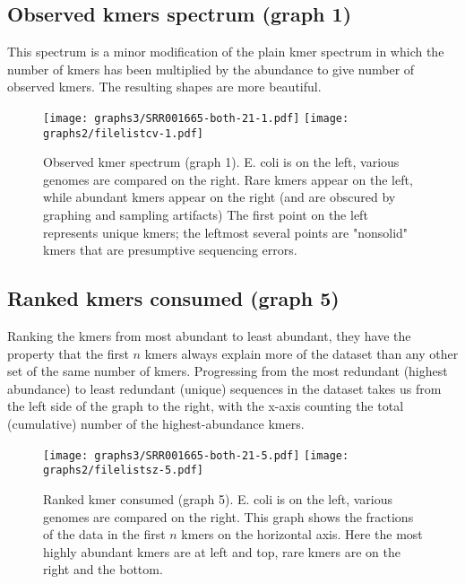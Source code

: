 \documentclass[11pt,fullpage]{article}
\begin{document}
\subsection{Observed kmers spectrum (graph 1) }

This spectrum is a minor modification of the plain kmer spectrum in which the number
of kmers has been multiplied by the abundance to give number of observed kmers.
The resulting shapes are more beautiful. 

\begin{figure}
\begin{center}
\texttt{[image: graphs3/SRR001665-both-21-1.pdf]} \texttt{[image: graphs2/filelistcv-1.pdf]}
\end{center}
\caption{Observed kmer spectrum (graph 1).  E. coli is on the left, various genomes are compared on the right.  
Rare kmers appear on the left, while abundant kmers appear on the right (and are obscured by graphing and sampling artifacts) 
The first point on the left represents unique kmers; the leftmost several points are "nonsolid" kmers
that are presumptive sequencing errors. }
\label{graph1}
\end{figure}

\subsection{Ranked kmers consumed (graph 5) }

Ranking the kmers from most abundant to least abundant, they have the property that the 
first $n$ kmers always explain more of the dataset than any other set of the same number
of kmers.  Progressing from the most redundant (highest abundance) to least redundant 
(unique) sequences in the dataset takes us from the left side of the graph to the right, 
with the x-axis counting the total (cumulative) number of the highest-abundance kmers.

\begin{figure}
\begin{center}
\texttt{[image: graphs3/SRR001665-both-21-5.pdf]} \texttt{[image: graphs2/filelistsz-5.pdf]}
\end{center}
\caption{Ranked kmer consumed (graph 5).  E. coli is on the left, various genomes are compared on the right. This 
graph shows the fractions of the data in the first $n$ kmers on the horizontal axis.  Here the most highly abundant
kmers are at left and top, rare kmers are on the right and the bottom.}
\label{graph5}
\end{figure}
	
\end{document}
